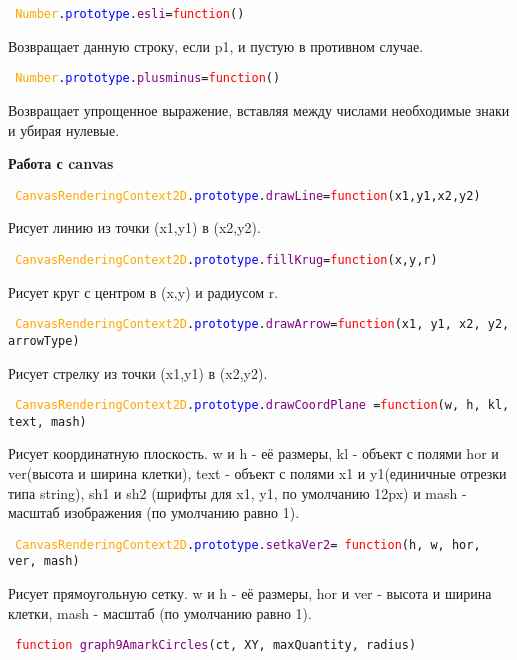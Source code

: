 \texttt{
	\textcolor{Orange}{Number}.\textcolor{Blue}{prototype}.\textcolor{Purple}{esli}=\textcolor{Red}{function}()
}

Возвращает данную строку, если p1, и пустую в противном случае.

\texttt{
	\textcolor{Orange}{Number}.\textcolor{Blue}{prototype}.\textcolor{Purple}{plusminus}=\textcolor{Red}{function}()
}

Возвращает упрощенное выражение, вставляя между числами необходимые знаки и убирая нулевые.

\textbf{Работа с canvas}

\texttt{
	\textcolor{Orange}{CanvasRenderingContext2D}.\textcolor{Blue}{prototype}.\textcolor{Purple}{drawLine}=\textcolor{Red}{function}(x1,y1,x2,y2)
}

Рисует линию из точки (x1,y1) в (x2,y2).

\texttt{
	\textcolor{Orange}{CanvasRenderingContext2D}.\textcolor{Blue}{prototype}.\textcolor{Purple}{fillKrug}=\textcolor{Red}{function}(x,y,r)
}

Рисует круг с центром в (x,y) и радиусом r.

\texttt{
	\textcolor{Orange}{CanvasRenderingContext2D}.\textcolor{Blue}{prototype}.\textcolor{Purple}{drawArrow}=\textcolor{Red}{function}(x1, y1, x2, y2, arrowType)
}%

Рисует стрелку из точки (x1,y1) в (x2,y2).

\texttt{
	\textcolor{Orange}{CanvasRenderingContext2D}.\textcolor{Blue}{prototype}.\textcolor{Purple}{drawCoordPlane }=\textcolor{Red}{function}(w, h, kl, text, mash)
}

Рисует координатную плоскость. w и h  \-- её размеры, kl \-- объект с полями hor и ver(высота и ширина клетки), text \-- объект с полями x1 и y1(единичные отрезки типа string), sh1 и sh2 (шрифты для x1, y1, по умолчанию 12px) и mash - масштаб изображения (по умолчанию равно 1).

\texttt{
	\textcolor{Orange}{CanvasRenderingContext2D}.\textcolor{Blue}{prototype}.\textcolor{Purple}{setkaVer2}=
	\newline
	\textcolor{Red}{function}(h, w, hor, ver, mash)
}

Рисует прямоугольную сетку. w и h  \-- её размеры, hor и ver \-- высота и ширина клетки, mash - масштаб (по умолчанию равно 1).

\texttt{
	\textcolor{Red}{function} \textcolor{Purple}{graph9AmarkCircles}(ct, XY, maxQuantity, radius)
}

